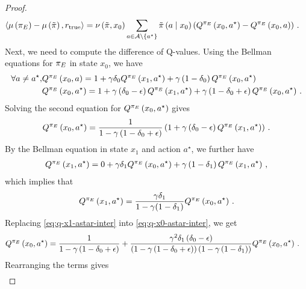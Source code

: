 \begin{proof}
    \begin{align*}
        \left\langle \mu \left( {\pi_E} \right) - \mu \left( \tilde{\pi} \right), r_{\textup{true}} \right\rangle &= \nu \left( \tilde{\pi}, x_0 \right) \sum_{a \in \mathcal{A} \setminus \left\{ a^\star \right\}} \tilde{\pi} \left( a \mathrel{}\middle|\mathrel{} x_0 \right) \left( Q^{\pi_E} \left( x_0, a^\star \right)  - Q^{\pi_E} \left( x_0, a \right) \right)\,.
    \end{align*}
    Next, we need to compute the difference of Q-values. Using the Bellman equations for ${\pi_E}$ in state $x_0$, we have
    \begin{align}
        \forall a \neq a^\star, &Q^{\pi_E} \left( x_0, a \right) = 1 + \gamma \delta_0 Q^{\pi_E} \left( x_1, a^\star \right) + \gamma \left( 1 - \delta_0 \right) Q^{\pi_E} \left( x_0, a^\star \right) \label{eq:bellman-eq-x0-a} \\
        &Q^{\pi_E} \left( x_0, a^\star \right) = 1 + \gamma \left( \delta_0 - \epsilon \right) Q^{\pi_E} \left( x_1, a^\star \right) + \gamma \left( 1 - \delta_0 + \epsilon \right) Q^{\pi_E} \left( x_0, a^\star \right)\,. \label{eq:bellman-eq-x0-astar}
    \end{align}
    Solving the second equation for $Q^{\pi_E} \left( x_0, a^\star \right)$ gives
    \begin{align}
        Q^{\pi_E} \left( x_0, a^\star \right) = \frac{1}{1 - \gamma \left( 1 - \delta_0 + \epsilon \right)} \left( 1 + \gamma \left( \delta_0 - \epsilon \right) Q^{\pi_E} \left( x_1, a^\star \right) \right) \label{eq:q-x0-astar-inter}\,.
    \end{align}
    By the Bellman equation in state $x_1$ and action $a^\star$, we further have
    \begin{align*}
        Q^{\pi_E} \left( x_1, a^\star \right) = 0 + \gamma \delta_1 Q^{\pi_E} \left( x_0, a^\star \right) + \gamma \left( 1 - \delta_1 \right) Q^{\pi_E} \left( x_1, a^\star \right)\,,
    \end{align*}
    which implies that
    \begin{align}
        Q^{\pi_E} \left( x_1, a^\star \right) = \frac{\gamma \delta_1}{1 - \gamma(1 - \delta_1)} Q^{\pi_E} \left( x_0, a^\star \right)\,. \label{eq:q-x1-astar-inter}
    \end{align}
    Replacing \eqref{eq:q-x1-astar-inter} into \eqref{eq:q-x0-astar-inter}, we get
    \begin{align*}
        Q^{\pi_E} \left( x_0, a^\star \right) &= \frac{1}{1 - \gamma \left( 1 - \delta_0 + \epsilon \right)} + \frac{\gamma^2 \delta_1 \left( \delta_0 - \epsilon \right)}{\left( 1 - \gamma \left( 1 - \delta_0 + \epsilon \right) \right) \left( 1 - \gamma \left( 1 - \delta_1 \right) \right)} Q^{\pi_E} \left( x_0, a^\star \right)\,.
    \end{align*}
    Rearranging the terms gives
    \begin{align}

\end{align}
\end{proof}
